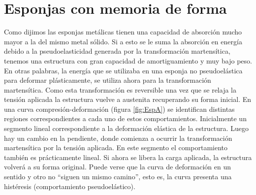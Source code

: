 \documentclass[a4paper,12pt,fleqn,twoside,openany]{book}
\begin{document}








\section{Esponjas con memoria de forma }
\label{sec:SMF}

Como dijimos las esponjas metálicas tienen una capacidad de absorción mucho mayor a la del mismo metal sólido. Si a esto se le suma la absorción en energía 
debido a la pseudoelasticidad generada por la transformación martensítica, tenemos una estructura con gran capacidad de amortiguamiento y muy bajo 
peso. En otras palabras, la energía que se utilizaba en una esponja no pseudoelástica para deformar plásticamente, se utiliza ahora para la transformación
martensítica. Como esta transformación es reversible una vez que se relaja la tensión aplicada la estructura vuelve a austenita recuperando su forma 
inicial. En una curva compresión-deformación (figura \ref{fig:EspA}) se identifican distintas regiones correspondientes a cada uno de estos comportamientos. Inicialmente un 
segmento lineal correspondiente a la deformación elástica de la estructura. Luego hay un cambio en la pendiente, donde comienza a ocurrir 
la transformación martensítica por la tensión aplicada. En este segmento el comportamiento también es prácticamente lineal. Si ahora se libera la carga 
aplicada, la estructura volverá a su forma original. Puede verse que la curva de deformación en un sentido y otro no “siguen un mismo camino”, esto es, 
la curva presenta una histéresis (comportamiento pseudoelástico). 
\end{document}
